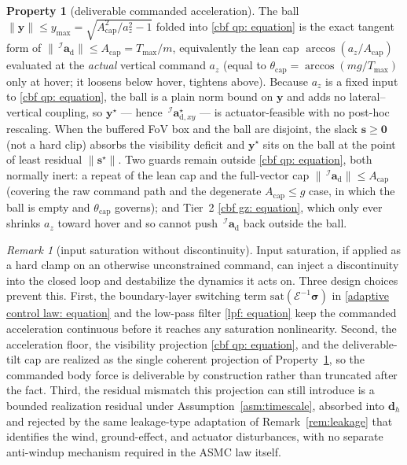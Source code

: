 \documentclass{IEEEtaes}
\theoremstyle{definition}
\newtheorem{property}{Property}
\theoremstyle{remark}
\newtheorem{remark}{Remark}
\begin{document}
\begin{property}[deliverable commanded acceleration]\label{prop:deliverable} The ball $\|\boldsymbol{y}\|\le y_\text{max}=\sqrt{A_\text{cap}^2/a_z^2-1}$ folded into \eqref{cbf qp: equation} is the exact tangent form of $\|\,^\mathcal{I}\boldsymbol{a}_\text{d}\|\le A_\text{cap}=T_\text{max}/m$, equivalently the lean cap $\arccos(a_z/A_\text{cap})$ evaluated at the \emph{actual} vertical command $a_z$ (equal to $\theta_\text{cap}=\arccos(mg/T_\text{max})$ only at hover; it loosens below hover, tightens above). Because $a_z$ is a fixed input to \eqref{cbf qp: equation}, the ball is a plain norm bound on $\boldsymbol{y}$ and adds no lateral--vertical coupling, so $\boldsymbol{y}^\star$ --- hence $\,^\mathcal{I}\boldsymbol{a}^\star_{\text{d},xy}$ --- is actuator-feasible with no post-hoc rescaling. When the buffered FoV box and the ball are disjoint, the slack $\boldsymbol{s}\ge\boldsymbol{0}$ (not a hard clip) absorbs the visibility deficit and $\boldsymbol{y}^\star$ sits on the ball at the point of least residual $\|\boldsymbol{s}^\star\|$. Two guards remain outside \eqref{cbf qp: equation}, both normally inert: a repeat of the lean cap and the full-vector cap $\|\,^\mathcal{I}\boldsymbol{a}_\text{d}\|\le A_\text{cap}$ (covering the raw command path and the degenerate $A_\text{cap}\le g$ case, in which the ball is empty and $\theta_\text{cap}$ governs); and Tier~2 \eqref{cbf gz: equation}, which only ever shrinks $a_z$ toward hover and so cannot push $\,^\mathcal{I}\boldsymbol{a}_\text{d}$ back outside the ball.\end{property}

\begin{remark}[input saturation without discontinuity]\label{rem:saturation} Input saturation, if applied as a hard clamp on an otherwise unconstrained command, can inject a discontinuity into the closed loop and destabilize the dynamics it acts on. Three design choices prevent this. First, the boundary-layer switching term $\text{sat}(\mathcal{E}^{-1}\boldsymbol{\sigma})$ in \eqref{adaptive control law: equation} and the low-pass filter \eqref{lpf: equation} keep the commanded acceleration continuous before it reaches any saturation nonlinearity. Second, the acceleration floor, the visibility projection \eqref{cbf qp: equation}, and the deliverable-tilt cap are realized as the single coherent projection of Property~\ref{prop:deliverable}, so the commanded body force is deliverable by construction rather than truncated after the fact. Third, the residual mismatch this projection can still introduce is a bounded realization residual under Assumption~\ref{asm:timescale}, absorbed into $\boldsymbol{d}_h$ and rejected by the same leakage-type adaptation of Remark~\ref{rem:leakage} that identifies the wind, ground-effect, and actuator disturbances, with no separate anti-windup mechanism required in the ASMC law itself.\end{remark}
\end{document}
